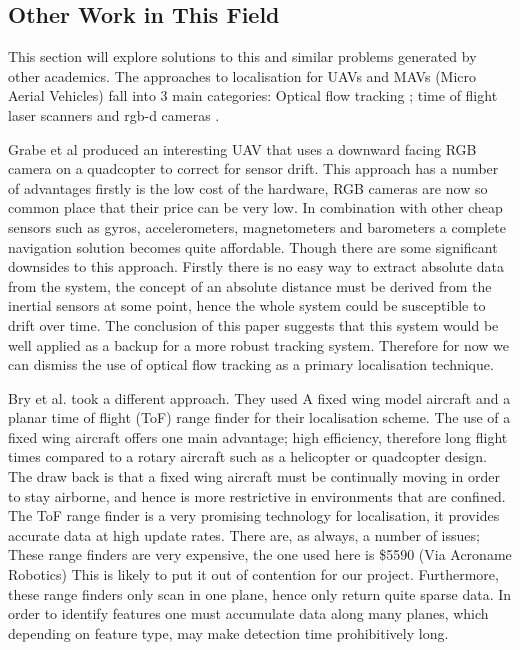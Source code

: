 \documentclass[]{article}
\begin{document}
{\subsection{Other Work in This Field} %
\label{sub:other_work_in_this_field}

This section will explore solutions to this and similar problems generated by other academics. The approaches to localisation for \ac{UAV}s and \ac{MAV}s (Micro Aerial Vehicles) fall into 3 main categories: Optical flow tracking \cite{DBLP:conf/icra/GrabeBG12}; time of flight laser scanners \cite{Bry2012} and rgb-d cameras \cite{Shen2012}.

Grabe et al\cite{DBLP:conf/icra/GrabeBG12} produced an interesting \ac{UAV} that uses a downward facing \ac{RGB} camera on a quadcopter to correct for sensor drift. This approach has a number of advantages firstly is the low cost of the hardware, \ac{RGB} cameras are now so common place that their price can be very low. In combination with other cheap sensors such as gyros, accelerometers, magnetometers and barometers a complete navigation solution becomes quite affordable. Though there are some significant downsides to this approach. Firstly there is no easy way to extract absolute data from the system, the concept of an absolute distance must be derived from the inertial sensors at some point, hence the whole system could be susceptible to drift over time. The conclusion of this paper suggests that this system would be well applied as a backup for a more robust tracking system. Therefore for now we can dismiss the use of optical flow tracking as a primary localisation technique. 

Bry et al. \cite{Bry2012} took a different approach. They used A fixed wing model aircraft and a planar time of flight (ToF) range finder for their localisation scheme. The use of a fixed wing aircraft offers one main advantage; high efficiency, therefore long flight times compared to a rotary aircraft such as a helicopter or quadcopter design. The draw back is that a fixed wing aircraft must be continually moving in order to stay airborne, and hence is more restrictive in environments that are confined. The ToF range finder is a very promising technology for localisation, it provides accurate data at high update rates. There are, as always, a number of issues; These range finders are very expensive, the one used here is \$5590 (Via Acroname Robotics)%
This is likely to put it out of contention for our project. Furthermore, these range finders only scan in one plane, hence only return quite sparse data. In order to identify features one must accumulate data along many planes, which depending on feature type, may make detection time prohibitively long. 

}
\end{document}
